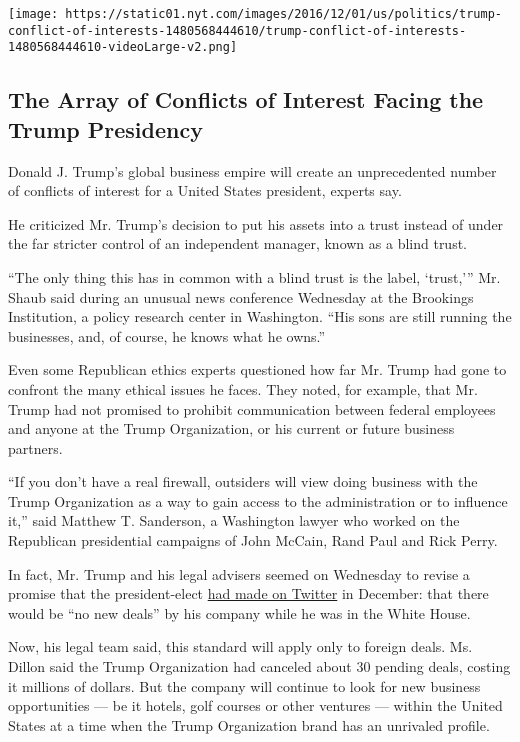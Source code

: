 \texttt{[image: https://static01.nyt.com/images/2016/12/01/us/politics/trump-conflict-of-interests-1480568444610/trump-conflict-of-interests-1480568444610-videoLarge-v2.png]}

\hypertarget{the-array-of-conflicts-of-interest-facing-the-trump-presidency}{%
\subsection{The Array of Conflicts of Interest Facing the Trump
Presidency}\label{the-array-of-conflicts-of-interest-facing-the-trump-presidency}}

Donald J. Trump's global business empire will create an unprecedented
number of conflicts of interest for a United States president, experts
say.

He criticized Mr. Trump's decision to put his assets into a trust
instead of under the far stricter control of an independent manager,
known as a blind trust.

``The only thing this has in common with a blind trust is the label,
`trust,''' Mr. Shaub said during an unusual news conference Wednesday at
the Brookings Institution, a policy research center in Washington. ``His
sons are still running the businesses, and, of course, he knows what he
owns.''

Even some Republican ethics experts questioned how far Mr. Trump had
gone to confront the many ethical issues he faces. They noted, for
example, that Mr. Trump had not promised to prohibit communication
between federal employees and anyone at the Trump Organization, or his
current or future business partners.

``If you don't have a real firewall, outsiders will view doing business
with the Trump Organization as a way to gain access to the
administration or to influence it,'' said Matthew T. Sanderson, a
Washington lawyer who worked on the Republican presidential campaigns of
John McCain, Rand Paul and Rick Perry.

In fact, Mr. Trump and his legal advisers seemed on Wednesday to revise
a promise that the president-elect
\href{https://twitter.com/realdonaldtrump/status/808529888630239232}{had
made on Twitter} in December: that there would be ``no new deals'' by
his company while he was in the White House.

Now, his legal team said, this standard will apply only to foreign
deals. Ms. Dillon said the Trump Organization had canceled about 30
pending deals, costing it millions of dollars. But the company will
continue to look for new business opportunities --- be it hotels, golf
courses or other ventures --- within the United States at a time when
the Trump Organization brand has an unrivaled profile.

